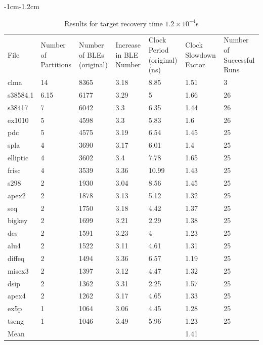 \documentclass[12pt,final,oneside]{dwThesis} %
\begin{document}
\begin{table}
\begin{adjustwidth}
\begin{tabularx}
            \bottomrule 
         \end{tabularx}
         \caption{Results for target recovery time
            $7.5\times10^{-5}$s} \label{Results7.5e-5} 
      \end{adjustwidth}

   \end{table}

   \begin{table}
      \footnotesize 
      \begin{adjustwidth}
         {-1cm}{-1.2cm}

         \begin{tabularx}
            {1.1\textwidth}{XXXXXXX} \toprule
            File & Number of Partitions &  Number of BLEs (original) &  Increase in BLE Number &  Clock Period (original) (ns) &  Clock Slowdown Factor &  Number of Successful Runs\\
clma & 14 & 8365 & 3.18 & 8.85 & 1.51 & 3\\
s38584.1 & 6.15 & 6177 & 3.29 & 5 & 1.66 & 26\\
s38417 & 7 & 6042 & 3.3 & 6.35 & 1.44 & 26\\
ex1010 & 5 & 4598 & 3.3 & 5.83 & 1.6 & 26\\
pdc & 5 & 4575 & 3.19 & 6.54 & 1.45 & 25\\
spla & 4 & 3690 & 3.17 & 6.01 & 1.4 & 25\\
elliptic & 4 & 3602 & 3.4 & 7.78 & 1.65 & 25\\
frisc & 4 & 3539 & 3.36 & 10.99 & 1.43 & 25\\
s298 & 2 & 1930 & 3.04 & 8.56 & 1.45 & 25\\
apex2 & 2 & 1878 & 3.13 & 5.12 & 1.32 & 25\\
seq & 2 & 1750 & 3.18 & 4.42 & 1.37 & 25\\
bigkey & 2 & 1699 & 3.21 & 2.29 & 1.38 & 25\\
des & 2 & 1591 & 3.23 & 4 & 1.23 & 25\\
alu4 & 2 & 1522 & 3.11 & 4.61 & 1.31 & 25\\
diffeq & 2 & 1494 & 3.36 & 6.57 & 1.19 & 25\\
misex3 & 2 & 1397 & 3.12 & 4.47 & 1.32 & 25\\
dsip & 2 & 1362 & 3.31 & 2.25 & 1.57 & 25\\
apex4 & 2 & 1262 & 3.17 & 4.65 & 1.33 & 25\\
ex5p & 1 & 1064 & 3.06 & 4.45 & 1.28 & 25\\
tseng & 1 & 1046 & 3.49 & 5.96 & 1.23 & 25\\
Mean &  &  &  &  & 1.41 & \\
            \bottomrule 
         \end{tabularx}
         \caption{Results for target recovery time
            $1.2\times10^{-4}$s} \label{Results1.2e-4} 
      \end{adjustwidth}

   \end{table}
\end{document}
